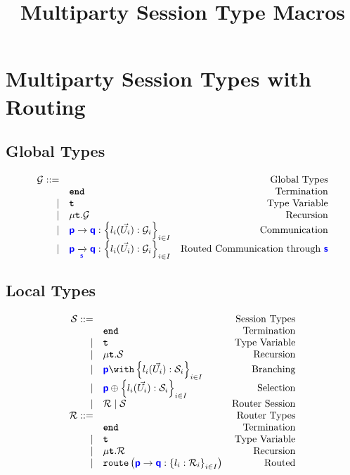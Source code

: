 \documentclass{article}
\title{Multiparty Session Type Macros}
\begin{document}
\maketitle

\section{Multiparty Session Types with Routing}


\subsection{Global Types}
\doublespacing
\[
\begin{array}{rlr}
	\newglobal ::= & & \text{Global Types} \\
     & \tyend & \text{Termination} \\
	\mid & \tyrecvar & \text{Type Variable} \\
	\mid & \tyrec{\newglobal} & \text{Recursion} \\
	\mid & \gcomm{p}{q}{l_i(\vec{U_i}): \newglobal_i}{i \in I} & \text{Communication} \\
	\mid & \gcommroute{p}{q}{s}{l_i(\vec{U_i}): \newglobal_i}{i \in I} & \text{Routed Communication through $\role{s}$} \\
\end{array}
\]
\singlespacing

\subsection{Local Types}
\doublespacing
\[
\begin{array}{rlr}
    \newlocal ::= & & \text{Session Types} \\
     & \tyend & \text{Termination} \\
     	\mid & \tyrecvar & \text{Type Variable} \\
     	\mid & \tyrec{\newlocal} & \text{Recursion} \\
		\mid & \tybra{p}{l_i(\vec{U_i}): \newlocal_i}{i \in I} & \text{Branching} \\
		\mid & \tysel{p}{l_i(\vec{U_i}): \newlocal_i}{i \in I} & \text{Selection} \\
		\mid & \tyroutepar{\newroute}{\newlocal} & \text{Router Session} \\
	\newroute ::= & & \text{Router Types} \\
	 & \tyend & \text{Termination} \\
     	\mid & \tyrecvar & \text{Type Variable} \\
     	\mid & \tyrec{\newroute} & \text{Recursion} \\
     	\mid & \tyroute{p}{q}{l_i: \newroute_i}{i \in I} & \text{Routed} \\
\end{array}
\]
\singlespacing
\end{document}
